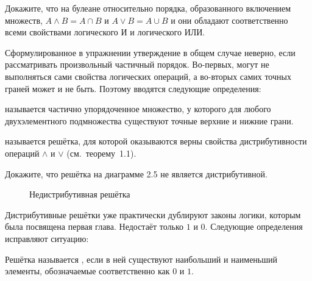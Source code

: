 \begin{exercise}
Докажите, что на булеане относительно порядка, образованного включением множеств, $A\wedge B = A\cap B$ и $A\vee B = A \cup B$ и они обладают соответственно всеми свойствами логического И и логического ИЛИ.
\end{exercise}

Сформулированное в упражнении утверждение в общем случае неверно, если рассматривать произвольный частичный порядок. Во-первых, могут не выполняться сами свойства логических операций, а во-вторых самих точных граней может и не быть. Поэтому вводятся следующие определения:

\begin{definition}
 называется частично упорядоченное множество, у которого для любого двухэлементного подмножества существуют точные верхние и нижние грани.
\end{definition}

\begin{definition}
 называется решётка, для которой оказываются верны свойства дистрибутивности операций $\wedge$ и $\vee$ (см.~теорему~1.1).
\end{definition}

\begin{exercise}
Докажите, что решётка на диаграмме 2.5 не является дистрибутивной.
\end{exercise}

\begin{figure}[h]
\centering
{}
\caption{Недистрибутивная решётка}
\end{figure}

Дистрибутивные решётки уже практически дублируют законы логики, которым была посвящена первая глава. Недостаёт только $1$ и $0$. Следующие определения исправляют ситуацию:

\begin{definition}
Решётка называется , если в ней существуют наибольший и наименьший элементы, обозначаемые соответственно как $0$ и $1$.
\end{definition}

